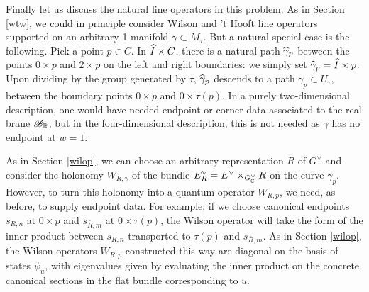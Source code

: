 \documentclass[11pt,a4paper]{article}
\begin{document}
 Finally let us discuss the natural line operators in this problem. 
As in Section \ref{wtw}, we could in principle consider Wilson and 't Hooft line operators supported on an arbitrary 1-manifold $\gamma\subset M_\tau$.
But a natural special case is the following.  Pick a point $p\in C$.   In $\widehat I\times C $, there is a natural path $\widehat\gamma_p$ between the points $0\times p$ and $2\times p$
on the left and right boundaries: we simply set $\widehat\gamma_p = \widehat I\times p$.    Upon dividing by the group generated by $\tau$, 
$\widehat\gamma_p$ descends to a path  $\gamma_p\subset
U_\tau$,  between the boundary points $0\times p$ and $0\times \tau(p)$.  In a purely two-dimensional description, one would have needed endpoint or
corner data associated to the real brane ${{\mathscr B}}_{\mathbb{R}}$, but in the four-dimensional description, this is not needed as $\gamma$ has no endpoint at $w=1$.


As in Section \ref{wilop}, we can choose an arbitrary representation $R$ of $G^\vee$
and consider the holonomy $W_{R,\gamma}$
of the bundle $E^\vee_R=E^\vee\times_{G^\vee_{\mathbb C}}R$ on the curve $\gamma_p$.   However, to turn this holonomy into a quantum operator $ W_{R,p}$,
we need, as before, to supply  endpoint data. 
For example, if we choose canonical endpoints $s_{R,n}$ at $0\times p$ and 
$s_{\bar R, m}$ at $0\times \tau(p)$, the Wilson operator will take the form of the inner product between $s_{R,n}$ transported to $\tau(p)$ and $s_{\bar R, m}$. As 
in Section \ref{wilop}, the Wilson operators $W_{R,p}$ constructed this way are diagonal
on the basis of states $\psi_u$, with eigenvalues given by evaluating the inner product on the concrete canonical sections in the flat bundle corresponding to $u$.  
\end{document}
